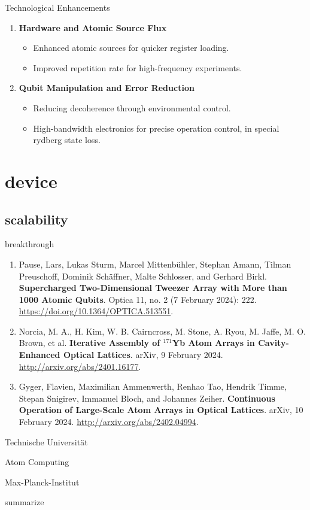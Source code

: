 \documentclass[18 pt]{beamer}
\begin{document}
\begin{frame}{Technological Enhancements}
  \begin{enumerate}
    \item \textbf{Hardware and Atomic Source Flux}
      \begin{itemize}[itemsep=5pt]
        \item Enhanced atomic sources for quicker register loading.
        \item Improved repetition rate for high-frequency experiments.
      \end{itemize}
    \item \textbf{Qubit Manipulation and Error Reduction}
      \begin{itemize}[itemsep=5pt]
        \item Reducing decoherence through environmental control.
        \item High-bandwidth electronics for precise operation control, in special rydberg state loss.
      \end{itemize}
  \end{enumerate}
\end{frame}
\section{device}
\subsection{scalability}
\begin{frame}{breakthrough}
  \begin{enumerate}[itemsep=10pt]
    \item Pause, Lars, Lukas Sturm, Marcel Mittenbühler, Stephan Amann, Tilman Preuschoff, Dominik Schäffner, Malte Schlosser, and Gerhard Birkl. \textbf{Supercharged Two-Dimensional Tweezer Array with More than 1000 Atomic Qubits}. Optica 11, no. 2 (7 February 2024): 222. \url{https://doi.org/10.1364/OPTICA.513551}.
    \item Norcia, M. A., H. Kim, W. B. Cairncross, M. Stone, A. Ryou, M. Jaffe, M. O. Brown, et al. \textbf{Iterative Assembly of $^{171}$Yb Atom Arrays in Cavity-Enhanced Optical Lattices}. arXiv, 9 February 2024. \url{http://arxiv.org/abs/2401.16177}.
    \item Gyger, Flavien, Maximilian Ammenwerth, Renhao Tao, Hendrik Timme, Stepan Snigirev, Immanuel Bloch, and Johannes Zeiher. \textbf{Continuous Operation of Large-Scale Atom Arrays in Optical Lattices}. arXiv, 10 February 2024. \url{http://arxiv.org/abs/2402.04994}.
  \end{enumerate}
\end{frame}
\begin{frame}{Technische Universität}
  
\end{frame}
\begin{frame}{Atom Computing}
\end{frame}
\begin{frame}{Max-Planck-Institut}
\end{frame}
\begin{frame}{summarize}
\end{frame}
\end{document}
